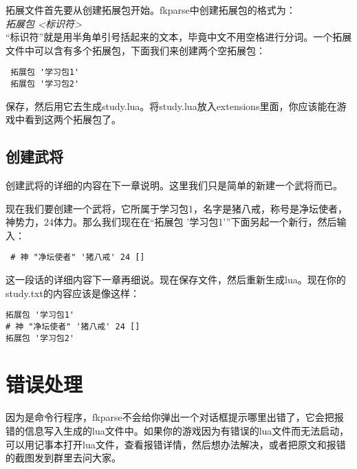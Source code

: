 拓展文件首先要从创建拓展包开始。fkparse中创建拓展包的格式为：\\

\emph{拓展包 <标识符>} \\

“标识符”就是用半角单引号括起来的文本，毕竟中文不用空格进行分词。一个拓展文件中可以含有多个拓展包，下面我们来创建两个空拓展包：

\begin{verbatim}
 拓展包 '学习包1'
 拓展包 '学习包2'
\end{verbatim}

保存，然后用它去生成study.lua。将study.lua放入extensions里面，你应该能在游戏中看到这两个拓展包了。

\subsection{创建武将}

创建武将的详细的内容在下一章说明。这里我们只是简单的新建一个武将而已。

现在我们要创建一个武将，它所属于学习包1，名字是猪八戒，称号是净坛使者，神势力，24体力。那么我们现在在“拓展包 '学习包1'”下面另起一个新行，然后输入：

\begin{verbatim}
 # 神 "净坛使者" '猪八戒' 24 []
\end{verbatim}

这一段话的详细内容下一章再细说。现在保存文件，然后重新生成lua。现在你的study.txt的内容应该是像这样：

\begin{verbatim}
拓展包 '学习包1'
# 神 "净坛使者" '猪八戒' 24 []
拓展包 '学习包2'
\end{verbatim}

\section{错误处理}

因为是命令行程序，fkparse不会给你弹出一个对话框提示哪里出错了，它会把报错的信息写入生成的lua文件中。如果你的游戏因为有错误的lua文件而无法启动，可以用记事本打开lua文件，查看报错详情，然后想办法解决，或者把原文和报错的截图发到群里去问大家。
